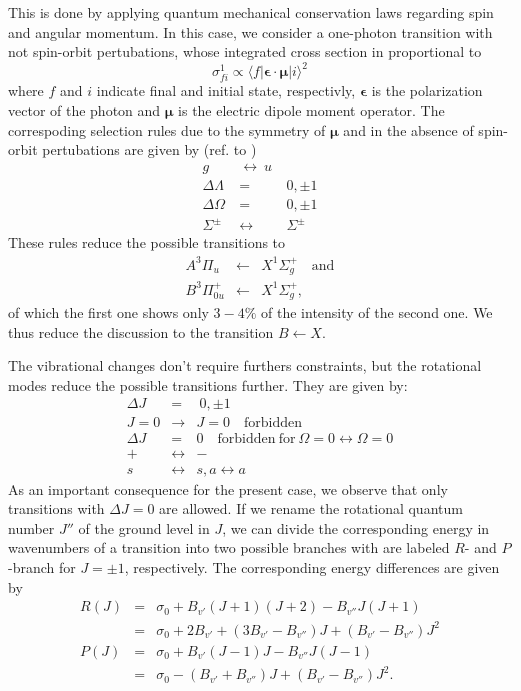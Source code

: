This is done by applying quantum mechanical 
conservation laws regarding spin and angular momentum. In this case, 
we consider a one-photon transition with not spin-orbit pertubations, 
whose integrated cross section in proportional to
\begin{equation}
    \sigma_{fi}^1 \propto \langle f | \mathbf{\epsilon \cdot \mu} | i \rangle^2
\end{equation}
 where $f$ and $i$ indicate final and initial state, respectivly, 
$\mathbf{\epsilon}$ is the polarization vector of the photon and
$\mathbf{\mu}$ is the electric dipole moment operator. 
The correspoding selection rules due to the symmetry of $\mathbf{\mu}$ 
and in the absence of spin-orbit pertubations 
are given by (ref. to \cite{lefebvre2004spectra}) 
\begin{eqnarray}
    g  \ &\leftrightarrow \ u \\
    \Delta \Lambda \ &=&  \  0, \pm 1 \\
    \Delta \Omega \ &=& \ 0, \pm 1 \\
    \Sigma^\pm \ &\leftrightarrow& \ \Sigma^\pm
\end{eqnarray}
These rules reduce the possible transitions to 
\begin{eqnarray}
    A ^3\Pi_{u} &\leftarrow & X ^1\Sigma_g^+ \quad \mathrm{and} \\
    B ^3\Pi_{0u}^+ &\leftarrow & X ^1\Sigma_g^+, 
\end{eqnarray}
of which the first one shows only $3 - 4\%$ of the intensity of 
the second one. We thus reduce the discussion to the transition 
 $B \leftarrow X$. 

The vibrational changes don't require furthers constraints, but the rotational 
modes reduce the possible transitions further. They are given by:
\begin{eqnarray}
    \Delta J \ &=&  \  0, \pm 1 \\
    J = 0 &\rightarrow& J = 0 \quad \mathrm{forbidden}\\
    \Delta J &=& 0 \quad \mathrm{forbidden \ for \ } \Omega = 0 \leftrightarrow \Omega = 0 \\
    + &\leftrightarrow& - \\
    s &\leftrightarrow& s, a \leftrightarrow a
\end{eqnarray}
As an important consequence for the present case, we observe that only 
transitions with $\Delta J = 0$ are allowed. If we rename the rotational 
quantum number $J''$ of the ground level in $J$, we can divide the corresponding 
energy in wavenumbers of a transition into two possible branches with are 
labeled $R$- and $P$-branch for $J = \pm 1$, respectively. The corresponding 
energy differences are given by
\begin{eqnarray}
    R(J) &=& \sigma_0 + B_{v'}(J + 1)(J + 2) - B_{v''}J (J + 1) \nonumber \\
         &=& \sigma_0 + 2 B_{v'} + (3 B_{v'} - B_{v''})J + (B_{v'} - B_{v''})J^2 \\
    P(J) &=& \sigma_0 + B_{v'}(J - 1)J - B_{v''}J (J - 1) \nonumber \\
         &=& \sigma_0 - (B_{v'} + B_{v''})J + (B_{v'} - B_{v''})J^2.
\end{eqnarray}

